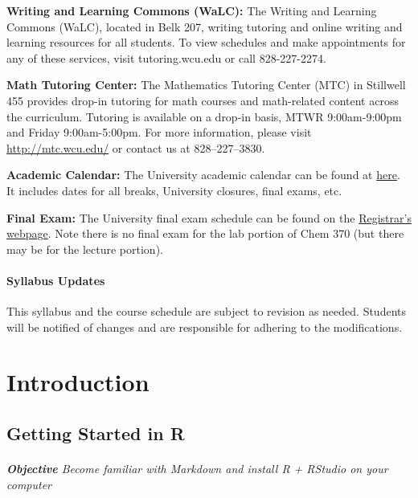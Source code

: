 \documentclass[]{tufte-book}
\begin{document}
\textbf{Writing and Learning Commons (WaLC):} The Writing and Learning Commons (WaLC), located in Belk 207, writing tutoring and online writing and learning resources for all students. To view schedules and make appointments for any of these services, visit tutoring.wcu.edu or call 828-227-2274.

\textbf{Math Tutoring Center:} The Mathematics Tutoring Center (MTC) in Stillwell 455 provides drop-in tutoring for math courses and math-related content across the curriculum. Tutoring is available on a drop-in basis, MTWR 9:00am-9:00pm and Friday 9:00am-5:00pm. For more information, please visit \url{http://mtc.wcu.edu/} or contact us at 828--227--3830.

\textbf{Academic Calendar:} The University academic calendar can be found at \href{http://www.wcu.edu/learn/academic-calendar.aspx}{here}. It includes dates for all breaks, University closures, final exams, etc.

\textbf{Final Exam:} The University final exam schedule can be found on the \href{http://www.wcu.edu/learn/academic-services/registrars-office/}{Registrar's webpage}. Note there is no final exam for the lab portion of Chem 370 (but there may be for the lecture portion).

\hypertarget{syllabus-updates}{%
\subsection*{Syllabus Updates}\label{syllabus-updates}}

This syllabus and the course schedule are subject to revision as needed. Students will be notified of changes and are responsible for adhering to the modifications.

\hypertarget{part-introduction}{%
\part{Introduction}\label{part-introduction}}

\hypertarget{getting-started-in-r}{%
\chapter{Getting Started in R}\label{getting-started-in-r}}

\hypertarget{objective-become-familiar-with-markdown-and-install-r-rstudio-on-your-computer}{%
\paragraph{\texorpdfstring{\textbf{Objective} \textbar{} Become familiar with Markdown and install R + RStudio on your computer}{Objective \textbar{} Become familiar with Markdown and install R + RStudio on your computer}}\label{objective-become-familiar-with-markdown-and-install-r-rstudio-on-your-computer}}
\end{document}

